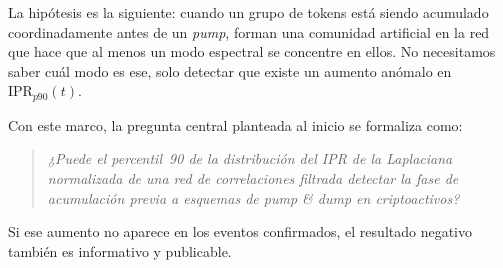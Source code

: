 La hipótesis es la siguiente: cuando un grupo de tokens está siendo acumulado
coordinadamente antes de un \emph{pump}, forman una comunidad artificial en la
red que hace que al menos un modo espectral se concentre en ellos. No necesitamos
saber cuál modo es ese, solo detectar que existe un aumento anómalo en
$\mathrm{IPR}_{p90}(t)$.

Con este marco, la pregunta central planteada al inicio se formaliza como:
\begin{quote}
  \emph{¿Puede el percentil~90 de la distribución del IPR de la Laplaciana
  normalizada de una red de correlaciones filtrada detectar la fase de
  acumulación previa a esquemas de \emph{pump \& dump} en criptoactivos?}
\end{quote}

Si ese aumento no aparece en los eventos confirmados, el resultado negativo
también es informativo y publicable.
